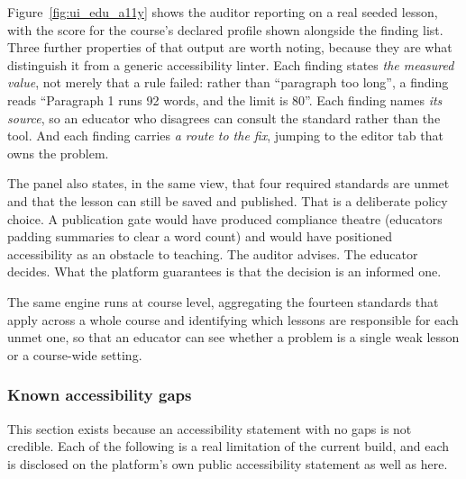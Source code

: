 \documentclass[12pt, oneside]{article} %
\begin{document}
Figure~\ref{fig:ui_edu_a11y} shows the auditor reporting on a real seeded lesson, with the score for the course's declared profile shown alongside the finding list. Three further properties of that output are worth noting, because they are what distinguish it from a generic accessibility linter. Each finding states \emph{the measured value}, not merely that a rule failed: rather than ``paragraph too long'', a finding reads ``Paragraph 1 runs 92 words, and the limit is 80''. Each finding names \emph{its source}, so an educator who disagrees can consult the standard rather than the tool. And each finding carries \emph{a route to the fix}, jumping to the editor tab that owns the problem.

The panel also states, in the same view, that four required standards are unmet and that the lesson can still be saved and published. That is a deliberate policy choice. A publication gate would have produced compliance theatre (educators padding summaries to clear a word count) and would have positioned accessibility as an obstacle to teaching. The auditor advises. The educator decides. What the platform guarantees is that the decision is an informed one.

The same engine runs at course level, aggregating the fourteen standards that apply across a whole course and identifying which lessons are responsible for each unmet one, so that an educator can see whether a problem is a single weak lesson or a course-wide setting.

\subsubsection{Known accessibility gaps}
\label{sec:a11y-gaps}

This section exists because an accessibility statement with no gaps is not credible. Each of the following is a real limitation of the current build, and each is disclosed on the platform's own public accessibility statement as well as here.
\end{document}
